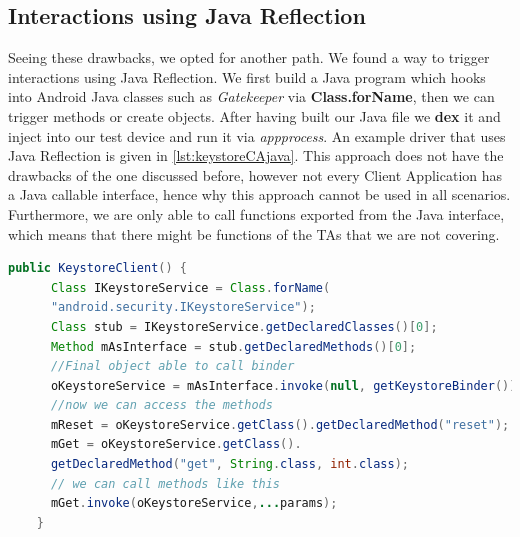 \documentclass[a4paper,11pt,oneside]{article}
\begin{document}
\subsection{Interactions using Java Reflection}
\label{sub:javaref}
Seeing these drawbacks, we opted
for another path. We found a way to trigger interactions using Java
Reflection. We first build a
Java program which hooks into Android Java classes such as \emph{Gatekeeper}
via \textbf{Class.forName}, then we can trigger methods or create objects.
After having built our Java file we \textbf{dex} it and inject into our test device and
run it via \emph{app\textunderscore process}. An example driver that uses Java Reflection is given in \autoref{lst:keystoreCAjava}. This approach does not have the
drawbacks of
the one discussed before, however not every Client Application has a Java
callable interface, hence why this approach cannot be used in all scenarios. Furthermore, we are only able to call functions exported from the Java interface, which means that there might be functions of the TAs that we are not covering.
\begin{lstlisting}[label= {lst:keystoreCAjava}, language=Java, caption=Example driver for Keystore]
public KeystoreClient() {
      Class IKeystoreService = Class.forName(
      "android.security.IKeystoreService");
      Class stub = IKeystoreService.getDeclaredClasses()[0];
      Method mAsInterface = stub.getDeclaredMethods()[0];
      //Final object able to call binder
      oKeystoreService = mAsInterface.invoke(null, getKeystoreBinder());
      //now we can access the methods
      mReset = oKeystoreService.getClass().getDeclaredMethod("reset");
      mGet = oKeystoreService.getClass().
      getDeclaredMethod("get", String.class, int.class);
      // we can call methods like this
      mGet.invoke(oKeystoreService,...params);
    }
\end{lstlisting}
\end{document}
